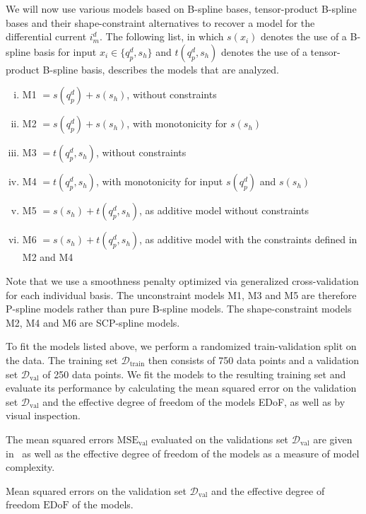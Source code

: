 We will now use various models based on B-spline bases, tensor-product B-spline bases and their shape-constraint alternatives to recover a model for the differential current $i_m^d$. The following list, in which $s(x_i)$ denotes the use of a B-spline basis for input $x_i \in \{q_p^d, s_h\}$ and $t(q_p^d, s_h)$ denotes the use of a tensor-product B-spline basis, describes the models that are analyzed.

\begin{enumerate}[(i)]
	\item M1 $= s(q_p^d) + s(s_h)$, without constraints
	\item M2 $= s(q_p^d) + s(s_h)$, with monotonicity for $s(s_h)$
	\item M3 $= t(q_p^d,s_h)$, without constraints
	\item M4 $= t(q_p^d,s_h)$, with monotonicity for input $s(q_p^d)$ and $s(s_h)$
	\item M5 $= s(s_h) + t(q_p^d,s_h)$, as additive model without constraints
	\item M6 $= s(s_h) + t(q_p^d,s_h)$, as additive model with the constraints defined in M2 and M4
\end{enumerate}
%
Note that we use a smoothness penalty optimized via generalized cross-validation for each individual basis. The unconstraint models M1, M3 and M5 are therefore P-spline models rather than pure B-spline models. The shape-constraint models M2, M4 and M6 are SCP-spline models. 


To fit the models listed above, we perform a randomized train-validation split on the data. The training set $\mathcal{D}_{\text{train}}$ then consists of 750 data points and a validation set $\mathcal{D}_{\text{val}}$ of 250 data points. We fit the models to the resulting training set and evaluate its performance by calculating the mean squared error on the validation set $\mathcal{D}_{\text{val}}$ and the effective degree of freedom of the models EDoF, as well as by visual inspection.


The mean squared errors $\mathrm{MSE}_{\mathrm{val}}$ evaluated on the validations set $\mathcal{D}_{\text{val}}$ are given in~ as well as the effective degree of freedom of the models as a measure of model complexity. 

\begin{table}[H]
	\begin{center}
	\end{center}
	\caption{Mean squared errors on the validation set $\mathcal{D}_{\text{val}}$ and the effective degree of freedom $\text{EDoF}$ of the models.}
	\label{tab:bosch-mse-val}
\end{table}

